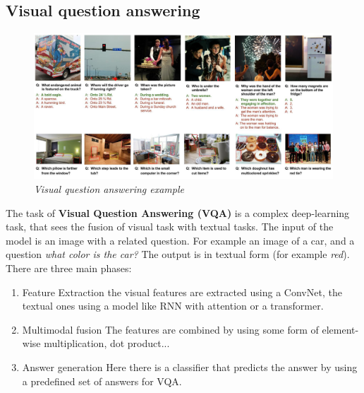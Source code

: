 \subsection{Visual question answering}
\begin{figure}[h]
    \centering
    \includegraphics[scale=0.2]{img/visual7w.jpg}
    \caption{\textit{Visual question answering example}}
\end{figure}
The task of \textbf{Visual Question Answering (VQA)} is a complex deep-learning task, that sees the fusion of visual task with textual tasks. The input of the model is an image with a related question. For example an image of a car, and a question \textit{what color is the car?} The output is in textual form (for example \textit{red}). There are three main phases: 
\begin{enumerate}
    \itemsep-0.2em
    \item \textsf{Feature Extraction} the visual features are extracted using a ConvNet, the textual ones using a model like RNN with attention or a transformer.
    \item \textsf{Multimodal fusion} The features are combined by using some form of element-wise multiplication, dot product...
    \item \textsf{Answer generation} Here there is a classifier that predicts the answer by using a predefined set of answers for VQA.
\end{enumerate}

